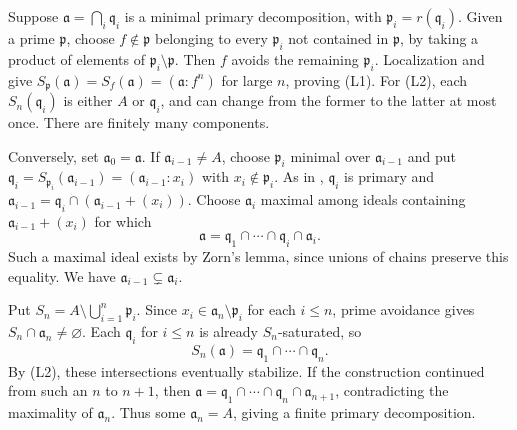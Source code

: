 Suppose $\mathfrak{a}=\bigcap_i\mathfrak{q}_i$ is a minimal primary decomposition, with $\mathfrak{p}_i=r(\mathfrak{q}_i)$. Given a prime $\mathfrak{p}$, choose $f\notin\mathfrak{p}$ belonging to every $\mathfrak{p}_i$ not contained in $\mathfrak{p}$, by taking a product of elements of $\mathfrak{p}_i\setminus\mathfrak{p}$. Then $f$ avoids the remaining $\mathfrak{p}_i$. Localization and  give $S_{\mathfrak{p}}(\mathfrak{a})=S_f(\mathfrak{a})=(\mathfrak{a}:f^n)$ for large $n$, proving (L1). For (L2), each $S_n(\mathfrak{q}_i)$ is either $A$ or $\mathfrak{q}_i$, and can change from the former to the latter at most once. There are finitely many components.

Conversely, set $\mathfrak{a}_0=\mathfrak{a}$. If $\mathfrak{a}_{i-1}\ne A$, choose $\mathfrak{p}_i$ minimal over $\mathfrak{a}_{i-1}$ and put $\mathfrak{q}_i=S_{\mathfrak{p}_i}(\mathfrak{a}_{i-1})=(\mathfrak{a}_{i-1}:x_i)$ with $x_i\notin\mathfrak{p}_i$. As in , $\mathfrak{q}_i$ is primary and $\mathfrak{a}_{i-1}=\mathfrak{q}_i\cap(\mathfrak{a}_{i-1}+(x_i))$. Choose $\mathfrak{a}_i$ maximal among ideals containing $\mathfrak{a}_{i-1}+(x_i)$ for which
\[\mathfrak{a}=\mathfrak{q}_1\cap\cdots\cap\mathfrak{q}_i\cap\mathfrak{a}_i.\]
Such a maximal ideal exists by Zorn's lemma, since unions of chains preserve this equality. We have $\mathfrak{a}_{i-1}\subsetneq\mathfrak{a}_i$.

Put $S_n=A\setminus\bigcup_{i=1}^n\mathfrak{p}_i$. Since $x_i\in\mathfrak{a}_n\setminus\mathfrak{p}_i$ for each $i\le n$, prime avoidance gives $S_n\cap\mathfrak{a}_n\ne\varnothing$. Each $\mathfrak{q}_i$ for $i\le n$ is already $S_n$-saturated, so
\[S_n(\mathfrak{a})=\mathfrak{q}_1\cap\cdots\cap\mathfrak{q}_n.\]
By (L2), these intersections eventually stabilize. If the construction continued from such an $n$ to $n+1$, then $\mathfrak{a}=\mathfrak{q}_1\cap\cdots\cap\mathfrak{q}_n\cap\mathfrak{a}_{n+1}$, contradicting the maximality of $\mathfrak{a}_n$. Thus some $\mathfrak{a}_n=A$, giving a finite primary decomposition.
